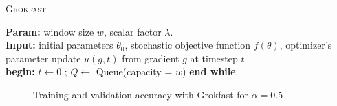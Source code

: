 \documentclass[UTF8]{article}
\begin{document}
\begin{algorithm}[H] \label{algorithm_Grokfast}
  \caption{\textsc{Grokfast}}
  \textbf{Param:} window size $w$, scalar factor $\lambda$.\\
  \textbf{Input:} initial parameters $\theta_0$, stochastic objective function $f(\theta)$, optimizer's parameter update $u(g, t)$ from gradient $g$ at timestep $t$.\\
  \textbf{begin:} $t \gets 0$ ; $Q \gets$ Queue(capacity = $w$)\;
  \textbf{end while}.
  \end{algorithm}
  
  \begin{figure}[H]
    \centering
    \vspace{-6mm}
    \caption{Training and validation accuracy with Grokfast for $\alpha=0.5$}
    \label{grokfast}
  \end{figure}
\end{document}
